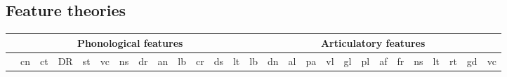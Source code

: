 \begin{landscape}%
\chapter{Feature theories}

\begin{table}[H]
\centering %
\tiny
\begin{tabular}{|c|c|c|c|c|c|c|c|c|c|c|c|c||c|c|c|c|c|c|c|c|c|c|c|c|c|c|}
\hline

&\multicolumn{12}{|c|}{Phonological features}&\multicolumn{14}{|c|}{Articulatory features}\\
\hline
&	cn	&	ct	&	DR	&	st	&	vc	&	ns	&	dr	&	an	&	lb	&	cr	&	ds	&	lt	&	lb	&	dn	&	al	&	pa	&	vl	&	gl	&	pl	&	af	&	fr	&	ns	&	lt	&	rt	&	gd	&	vc	\\
\hline


\end{tabular}
\end{table}
\end{landscape}
